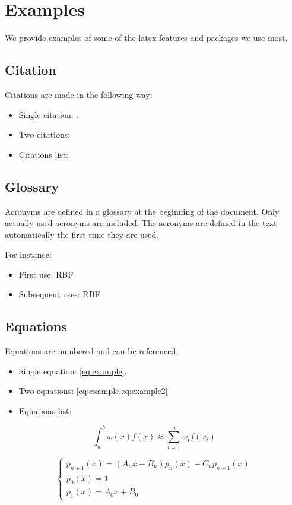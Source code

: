 \section{Examples}
We provide examples of some of the latex features and packages we use most.

\subsection{Citation}
Citations are made in the following way:
\begin{itemize}
\item Single citation: \cite{Gehrels:2016}.
\item Two citations:
\item Citations list:
\end{itemize}


\subsection{Glossary}
Acronyms are defined in a glossary at the beginning of the document. Only
actually used acronyms are included. The acronyms are defined in the text
automatically the first time they are used.

For instance:
\begin{itemize}
\item First use: \gls{RBF}
\item Subsequent uses: \gls{RBF}
\end{itemize}

\subsection{Equations}
Equations are numbered and can be referenced.
\begin{itemize}
\item Single equation: \cref{eq:example}.
\item Two equations: \cref{eq:example,eq:example2}
\item Equations list: 
\end{itemize}

\begin{equation} \label{eq:example}
\int_{a}^{b} \omega(x) f(x) \approx \sum_{i=1}^n w_i f(x_i)
\end{equation}

\begin{equation} \label{eq:example2}
\begin{cases}
p_{n+1}(x) = (A_n x + B_n) p_n(x) - C_n p_{n-1}(x) \\
p_0(x) = 1 \\
p_1(x) = A_0 x + B_0
\end{cases}
\end{equation}


